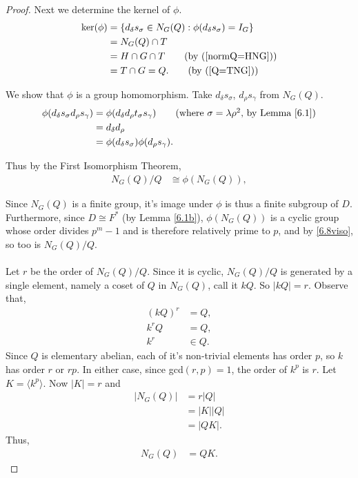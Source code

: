 \begin{proof}
Next we determine the kernel of $\phi$.
\begin{align*} \ker(\phi) &= \{ d_\delta s_\sigma \in N_G(Q) : \phi(d_\delta s_\sigma) = I_G \}
\\ &= N_G(Q) \cap T
\\ &= H \cap G \cap T \tag{by (\ref{normQ=HNG})}
\\ &= T \cap G = Q. \tag{by (\ref{Q=TNG})}
\end{align*}

We show that $\phi$ is a group homomorphism. Take $d_\delta s_\sigma$, $d_\rho s_\gamma$ from $ N_G(Q)$.
\begin{align*} \phi(d_\delta s_\sigma d_\rho s_\gamma) &= \phi(d_\delta d_\rho t_\sigma s_\gamma) \tag{where $\sigma = \lambda \rho^2$, by Lemma \ref{6.1}}
\\ &= d_\delta d_\rho
\\ &= \phi(d_\delta s_\sigma) \phi(d_\rho s_\gamma).
\end{align*}

Thus by the First Isomorphism Theorem,
\begin{align}\label{6.8viso} N_G(Q) / Q &\cong \phi(N_G(Q)),
\end{align}

Since $N_G(Q)$ is a finite group, it's image under $\phi$ is thus a finite subgroup of $D$. Furthermore, since $D \cong F^*$ (by Lemma \ref{6.1b}), $\phi(N_G(Q))$ is a cyclic group whose order divides $p^m-1$ and is therefore relatively prime to $p$, and by \eqref{6.8viso}, so too is $N_G(Q) / Q$. \\
\\
Let $r$ be the order of $N_G(Q) / Q$. Since it is cyclic, $N_G(Q)/Q$ is generated by a single element, namely a coset of $Q$ in $N_G(Q)$, call it $kQ$. So $|kQ| = r$. Observe that,
\begin{align*} (kQ)^r &= Q,
\\ k^rQ &= Q,
\\ k^r &\in Q.
\end{align*}
Since $Q$ is elementary abelian, each of it's non-trivial elements has order $p$, so $k$ has order $r$ or $rp$. In either case, since gcd$(r,p)=1$, the order of $k^p$ is $r$. Let $K = \langle k^p \rangle$. Now $|K| = r$ and
\begin{align*} |N_G(Q)| &= r|Q|
\\ &= |K||Q|
\\ &= |QK|. \tag{since $Q \cap K = I_G$} 
\end{align*}
Thus,
\begin{align}\label{QK} N_G(Q) &= QK.
\end{align}
\end{proof}



